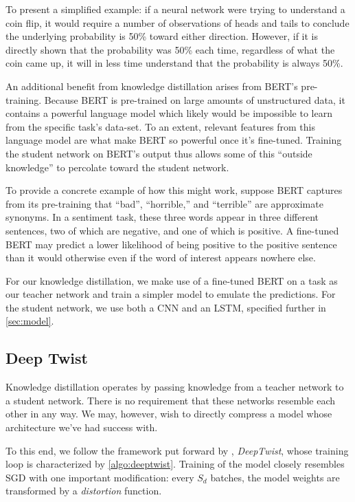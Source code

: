 \documentclass[10pt]{article}
\begin{document}
To present a simplified example: if a neural network were trying to understand
a coin flip, it would require a number of observations of heads and tails to
conclude the underlying probability is 50\% toward either direction. However,
if it is directly shown that the probability was 50\% each time, regardless of
what the coin came up, it will in less time understand that the probability is
always 50\%.

An additional benefit from knowledge distillation arises from BERT's
pre-training. Because BERT is pre-trained on large amounts of unstructured
data, it contains a powerful language model which likely would be impossible
to learn from the specific task's data-set. To an extent, relevant features
from this language model are what make BERT so powerful once it's fine-tuned.
Training the student network on BERT's output thus allows some of this
``outside knowledge'' to percolate toward the student network.

To provide a concrete example of how this might work, suppose BERT captures
from its pre-training that ``bad'', ``horrible,'' and ``terrible'' are
approximate synonyms. In a sentiment task, these three words appear in three
different sentences, two of which are negative, and one of which is positive.
A fine-tuned BERT may predict a lower likelihood of being positive to the
positive sentence than it would otherwise even if the word of interest appears
nowhere else.

For our knowledge distillation, we make use of a fine-tuned BERT on a task as
our teacher network and train a simpler model to emulate the predictions. For
the student network, we use both a CNN and an LSTM, specified further in
\cref{sec:model}.

\subsection{Deep Twist}

Knowledge distillation operates by passing knowledge from a teacher network to a
student network. There is no requirement that these networks resemble each other
in any way. We may, however, wish to directly compress a model whose
architecture we've had success with.

To this end, we follow the framework put forward by \citet{lee2018deeptwist},
\emph{DeepTwist}, whose training loop is characterized by \cref{algo:deeptwist}.
Training of the model closely resembles SGD with one important modification:
every $S_d$ batches, the model weights are transformed by a \emph{distortion}
function. 
\end{document}
